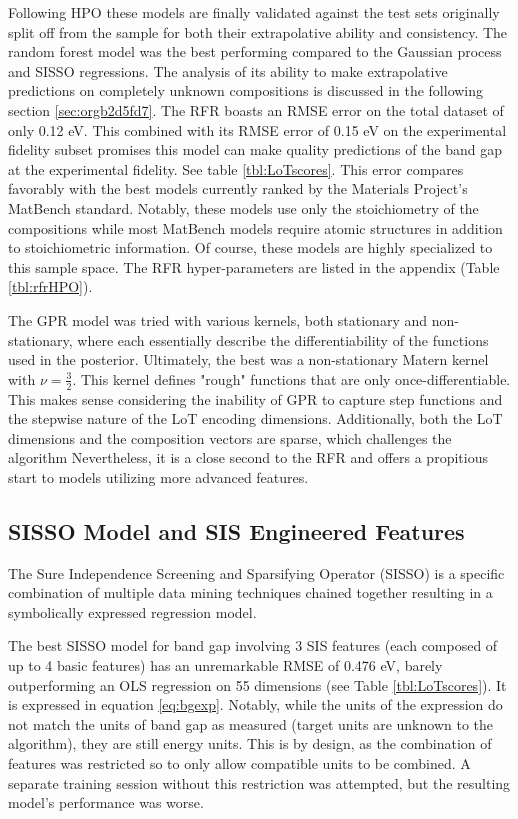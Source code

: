 Following HPO these models are finally validated against the test sets originally split off from the sample for both their extrapolative ability and consistency.
The random forest model was the best performing compared to the Gaussian process and SISSO regressions.
The analysis of its ability to make extrapolative predictions on completely unknown compositions is discussed in the following section \ref{sec:orgb2d5fd7}.
The RFR boasts an RMSE error on the total dataset of only 0.12 \unit{\electronvolt}.
This combined with its RMSE error of 0.15 \unit{\electronvolt} on the experimental fidelity subset promises this model can make quality predictions of the band gap at the experimental fidelity.
See table \ref{tbl:LoTscores}.
This error compares favorably with the best models currently ranked by the Materials Project's MatBench standard.
\autocite{dunn-2020-bench-mater}
Notably, these models use only the stoichiometry of the compositions while most MatBench models require atomic structures in addition to stoichiometric information.
Of course, these models are highly specialized to this sample space.
The RFR hyper-parameters are listed in the appendix (Table \ref{tbl:rfrHPO}).

The GPR model was tried with various kernels, both stationary and non-stationary, where each essentially describe the differentiability of the functions used in the posterior.
Ultimately, the best was a non-stationary Matern kernel with \(\nu = \frac{3}{2}\).
This kernel defines "rough" functions that are only once-differentiable.
This makes sense considering the inability of GPR to capture step functions and the stepwise nature of the LoT encoding dimensions.
Additionally, both the LoT dimensions and the composition vectors are sparse, which challenges the algorithm
Nevertheless, it is a close second to the RFR and offers a propitious start to models utilizing more advanced features.

\subsection{SISSO Model and SIS Engineered Features}
\label{sec:org3c8eaf2}
The Sure Independence Screening and Sparsifying Operator (SISSO) is a specific combination of multiple data mining techniques chained together resulting in a symbolically expressed regression model.
\autocite{ouyang-2018-sisso,ghiringhelli-2017-learn-physic} 

The best SISSO model for band gap involving 3 SIS features (each composed of up to 4 basic features) has an unremarkable RMSE of 0.476 eV, barely outperforming an OLS regression on 55 dimensions (see Table \ref{tbl:LoTscores}).
It is expressed in equation \ref{eq:bgexp}.
Notably, while the units of the expression do not match the units of band gap as measured (target units are unknown to the algorithm), they are still energy units.
This is by design, as the combination of features was restricted so to only allow compatible units to be combined.
A separate training session without this restriction was attempted, but the resulting model's performance was worse.

